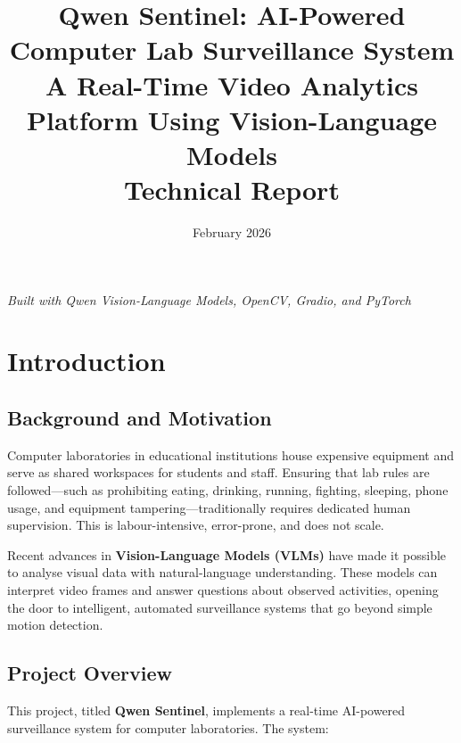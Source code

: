 \documentclass[12pt,a4paper]{article}
\title{
    \vspace{-1cm}
    \textbf{Qwen Sentinel: AI-Powered Computer Lab Surveillance System} \\[0.5cm]
    \large A Real-Time Video Analytics Platform Using Vision-Language Models \\[1cm]
    \large Technical Report
}
\author{}
\date{February 2026}
\begin{document}
\maketitle
\thispagestyle{empty}

\vfill
\begin{center}
    \textit{Built with Qwen Vision-Language Models, OpenCV, Gradio, and PyTorch}
\end{center}
\vfill

\newpage
\tableofcontents
\newpage

\section{Introduction}

\subsection{Background and Motivation}

Computer laboratories in educational institutions house expensive equipment and serve as shared workspaces for students and staff. Ensuring that lab rules are followed---such as prohibiting eating, drinking, running, fighting, sleeping, phone usage, and equipment tampering---traditionally requires dedicated human supervision. This is labour-intensive, error-prone, and does not scale.

Recent advances in \textbf{Vision-Language Models (VLMs)} have made it possible to analyse visual data with natural-language understanding. These models can interpret video frames and answer questions about observed activities, opening the door to intelligent, automated surveillance systems that go beyond simple motion detection.

\subsection{Project Overview}

This project, titled \textbf{Qwen Sentinel}, implements a real-time AI-powered surveillance system for computer laboratories. The system:
\end{document}
